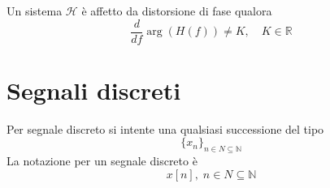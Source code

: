         \begin{definition}
            Un sistema $\mathcal{H}$ è affetto da distorsione di fase qualora
            \[
                \frac{d}{df} \arg(H(f)) \neq K, \quad K \in \mathbb{R}
            \]
        \end{definition}


\clearpage
\section{Segnali discreti}
    \begin{definition}
        Per segnale discreto si intente una qualsiasi successione del tipo 
        \[
            \{x_n\}_{n \in N \subseteq \mathbb{N}}
        \]
        La notazione per un segnale discreto è
        \[
            x[n], \; n \in N \subseteq \mathbb{N}
        \]
    \end{definition}

